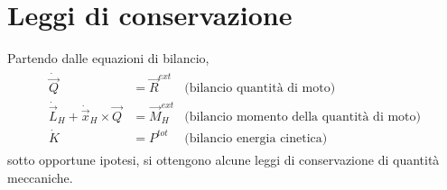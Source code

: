 \documentclass[letterpaper,10pt,italian]{jupyterBook}
\begin{document}
\section{Leggi di conservazione}
\label{\detokenize{ch/mechanics/dynamics-conservation:leggi-di-conservazione}}\label{\detokenize{ch/mechanics/dynamics-conservation:physics-hs-mechanics-dynamics-conservation}}\label{\detokenize{ch/mechanics/dynamics-conservation::doc}}
\sphinxAtStartPar
Partendo dalle equazioni di bilancio,
\begin{equation*}
\begin{split}\begin{aligned}
 \dot{\vec{Q}} & = \vec{R}^{ext} & \text{(bilancio quantità di moto)} \\
 \dot{\vec{L}}_H + \dot{\vec{x}}_H \times \vec{Q} & = \vec{M}_H^{ext} & \text{(bilancio momento della quantità di moto)} \\
 \dot{K} & = P^{tot} & \text{(bilancio energia cinetica)}
\end{aligned}\end{split}
\end{equation*}
\sphinxAtStartPar
sotto opportune ipotesi, si ottengono alcune leggi di conservazione di quantità meccaniche.
\end{document}
